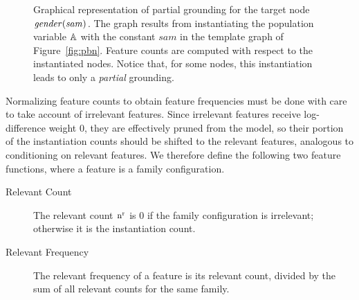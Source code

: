 \documentclass[runningheads,a4paper]{llncs}
\newcommand{\point}[1]{\noindent\emph{#1}.}
\begin{document}
\begin{figure}

\begin{center}
\caption{Graphical representation of partial grounding for the target node $\it{gender}(sam)$. The graph results from instantiating the population variable $\mathbb{A}$ with the constant $sam$ in the template graph of Figure~\ref{fig:pbn}. Feature counts are computed with respect to the instantiated nodes. Notice that, for some nodes, this instantiation leads to only a {\em partial} grounding.
\label{fig:regress}}
\end{center}
\end{figure}

Normalizing feature counts to obtain feature frequencies must be done with care to take account of irrelevant features. Since irrelevant features receive log-difference weight 0, they are effectively pruned from the model, so their portion of the instantiation counts should be shifted to the relevant features, analogous to conditioning on relevant features. We therefore define the following two feature functions, where a feature is a family configuration.





\begin{description}
\item[Relevant Count]  The relevant count $\mathrm{n}^{\mathrm{r}}$ is 0 if the family configuration is irrelevant; otherwise it is the instantiation count.
\item[Relevant Frequency] The relevant frequency of a feature is its relevant count, divided by the sum of all relevant counts for the same family.
\end{description}
\end{document}
